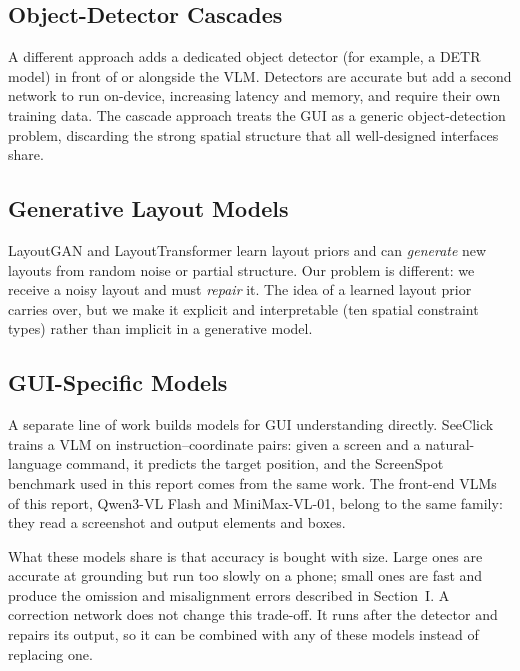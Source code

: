 \documentclass[11pt, letterpaper]{article}
\begin{document}
\subsection{Object-Detector Cascades}
A different approach adds a dedicated object detector (for example, a DETR
\cite{carion2020detr} model) in front of or alongside the VLM. Detectors are
accurate but add a second network to run on-device, increasing latency and
memory, and require their own training data. The cascade approach treats the
GUI as a generic object-detection problem, discarding the strong spatial
structure that all well-designed interfaces share.

\subsection{Generative Layout Models}
LayoutGAN \cite{li2019layoutgan} and LayoutTransformer
\cite{gupta2021layouttransformer} learn layout priors and can \emph{generate}
new layouts from random noise or partial structure. Our problem is
different: we receive a noisy layout and must \emph{repair} it. The idea of
a learned layout prior carries over, but we make it explicit and
interpretable (ten spatial constraint types) rather than implicit in a
generative model.

\subsection{GUI-Specific Models}
A separate line of work builds models for GUI understanding directly.
SeeClick~\cite{cheng2024seclick} trains a VLM on instruction--coordinate
pairs: given a screen and a natural-language command, it predicts the target
position, and the ScreenSpot benchmark used in this report comes from the
same work. The front-end VLMs of this report, Qwen3-VL Flash and
MiniMax-VL-01, belong to the same family: they read a screenshot and output
elements and boxes.

What these models share is that accuracy is bought with size. Large ones are
accurate at grounding but run too slowly on a phone; small ones are fast and
produce the omission and misalignment errors described in
Section~I. A correction network does not change this trade-off. It runs
after the detector and repairs its output, so it can be combined with any of
these models instead of replacing one.
\end{document}
